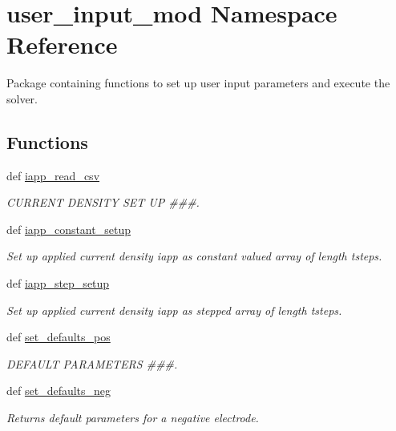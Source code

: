 \hypertarget{namespaceuser__input__mod}{\section{user\-\_\-input\-\_\-mod Namespace Reference}
\label{namespaceuser__input__mod}
}


Package containing functions to set up user input parameters and execute the solver.  


\subsection*{Functions}
\begin{DoxyCompactItemize}
\item 
def \hyperlink{namespaceuser__input__mod_a369d3751a2635edf6aca47c76e32a379}{iapp\-\_\-read\-\_\-csv}
\begin{DoxyCompactList}\small\item\em C\-U\-R\-R\-E\-N\-T D\-E\-N\-S\-I\-T\-Y S\-E\-T U\-P \#\#\#. \end{DoxyCompactList}\item 
def \hyperlink{namespaceuser__input__mod_ab782193387e8c3992d11b979bda4ddb7}{iapp\-\_\-constant\-\_\-setup}
\begin{DoxyCompactList}\small\item\em Set up applied current density iapp as constant valued array of length tsteps. \end{DoxyCompactList}\item 
def \hyperlink{namespaceuser__input__mod_a2511b60d779c810e395c24628cc22f6c}{iapp\-\_\-step\-\_\-setup}
\begin{DoxyCompactList}\small\item\em Set up applied current density iapp as stepped array of length tsteps. \end{DoxyCompactList}\item 
def \hyperlink{namespaceuser__input__mod_acef497295190e3914f7cd93da2708856}{set\-\_\-defaults\-\_\-pos}
\begin{DoxyCompactList}\small\item\em D\-E\-F\-A\-U\-L\-T P\-A\-R\-A\-M\-E\-T\-E\-R\-S \#\#\#. \end{DoxyCompactList}\item 
def \hyperlink{namespaceuser__input__mod_ad783135a051fdfddaadb06394ff84a73}{set\-\_\-defaults\-\_\-neg}
\begin{DoxyCompactList}\small\item\em Returns default parameters for a negative electrode. \end{DoxyCompactList}\item 

\end{DoxyCompactItemize}

